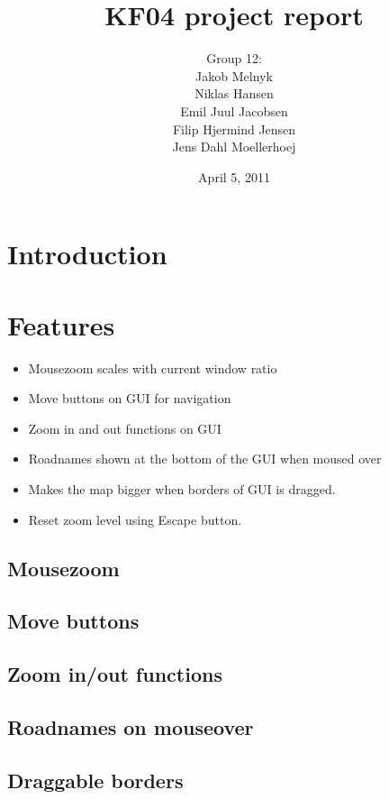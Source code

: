 \documentclass[11pt,a4paper,titlepage]{article}
\title{KF04 project report}
\author{
	Group 12:\\
	Jakob Melnyk\\
	Niklas Hansen\\
	Emil Juul Jacobsen\\
	Filip Hjermind Jensen\\
	Jens Dahl Moellerhoej\\
}
\date{April 5, 2011}
\begin{document}
\maketitle
\tableofcontents

\setlength{\parindent}{0pt}
\setlength{\parskip}{1.8ex plus 0.5ex minus 0.2ex}

\clearpage



\section{Introduction}
\section{Features}
\begin{itemize}
  \item 
	Mousezoom scales with current window ratio
  \item 
	Move buttons on GUI for navigation
  \item
  	Zoom in and out functions on GUI 
  \item 
  	Roadnames shown at the bottom of the GUI when moused over
  \item 
  	Makes the map bigger when borders of GUI is dragged.
  \item
  	 Reset zoom level using Escape button.
\end{itemize}

\subsection{Mousezoom}

\subsection{Move buttons}

\subsection{Zoom in/out functions}

\subsection{Roadnames on mouseover}

\subsection{Draggable borders}
\end{document}
